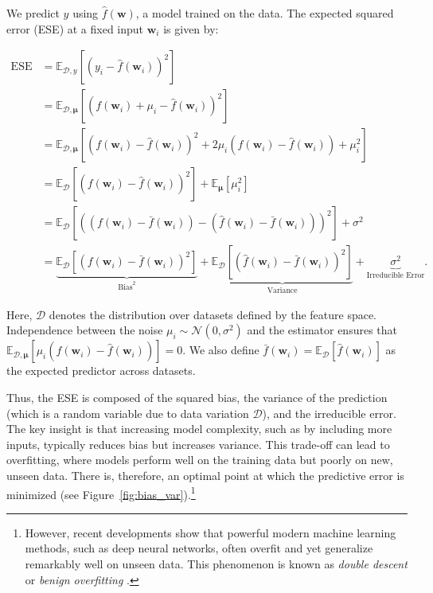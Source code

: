 We predict \( y \) using \( \hat{f}(\mathbf{w}) \), a model trained on the data. The expected squared error (ESE) at a fixed input \( \mathbf{w}_i \) is given by:

\begin{align*}
	\text{ESE} &= \mathbb{E}_{\mathcal{D},y} \left[ (y_i - \hat{f}(\mathbf{w}_i))^2 \right] \\
	&= \mathbb{E}_{\mathcal{D},\boldsymbol{\mu}} \left[ \left(f(\mathbf{w}_i) + \mu_i - \hat{f}(\mathbf{w}_i)\right)^2 \right] \\
	&= \mathbb{E}_{\mathcal{D},\boldsymbol{\mu}} \left[ (f(\mathbf{w}_i) - \hat{f}(\mathbf{w}_i))^2 + 2\mu_i(f(\mathbf{w}_i) - \hat{f}(\mathbf{w}_i)) + \mu_i^2 \right] \\
	&= \mathbb{E}_{\mathcal{D}} \left[ (f(\mathbf{w}_i) - \hat{f}(\mathbf{w}_i))^2 \right] + \mathbb{E}_{\boldsymbol{\mu}} \left[ \mu_i^2 \right] \\
	&= \mathbb{E}_{\mathcal{D}} \left[ \left((f(\mathbf{w}_i) - \bar{f}(\mathbf{w}_i)) - (\hat{f}(\mathbf{w}_i) - \bar{f}(\mathbf{w}_i)) \right)^2 \right] + \sigma^2 \\
	&= \underbrace{\mathbb{E}_{\mathcal{D}} \left[ (f(\mathbf{w}_i) - \bar{f}(\mathbf{w}_i))^2 \right]}_{\text{Bias}^2} + \underbrace{\mathbb{E}_{\mathcal{D}} \left[ (\hat{f}(\mathbf{w}_i) - \bar{f}(\mathbf{w}_i))^2 \right]}_{\text{Variance}} + \underbrace{\sigma^2}_{\text{Irreducible Error}}.
\end{align*}

Here, \( \mathcal{D} \) denotes the distribution over datasets defined by the feature space. Independence between the noise \( \mu_i \sim \mathcal{N}(0, \sigma^2) \) and the estimator ensures that \( \mathbb{E}_{\mathcal{D},\boldsymbol{\mu}} \left[\mu_i(f(\mathbf{w}_i) - \hat{f}(\mathbf{w}_i))\right] = 0 \). We also define \( \bar{f}(\mathbf{w}_i) = \mathbb{E}_{\mathcal{D}}[\hat{f}(\mathbf{w}_i)] \) as the expected predictor across datasets.

Thus, the ESE is composed of the squared bias, the variance of the prediction (which is a random variable due to data variation $\mathcal{D}$), and the irreducible error. The key insight is that increasing model complexity, such as by including more inputs, typically reduces bias but increases variance. This trade-off can lead to overfitting, where models perform well on the training data but poorly on new, unseen data. There is, therefore, an optimal point at which the predictive error is minimized (see Figure~\ref{fig:bias_var}).\footnote{However, recent developments show that powerful modern machine learning methods, such as deep neural networks, often overfit and yet generalize remarkably well on unseen data. This phenomenon is known as \textit{double descent} or \textit{benign overfitting} \cite{belkin2019reconciling, bartlett2020benign, hastie2022surprises}.}

